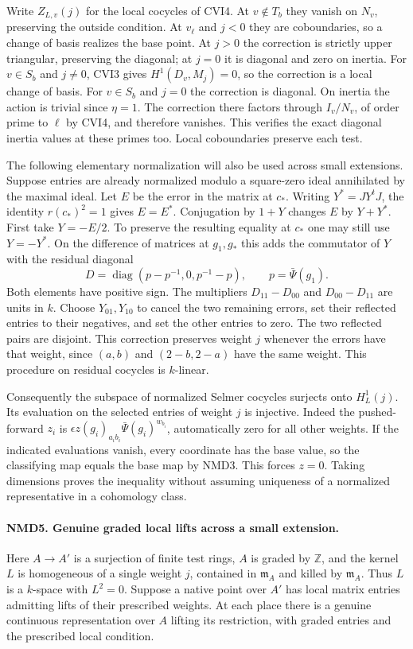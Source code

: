 Write $Z_{L,v}(j)$ for the local cocycles of CVI4. At
$v\notin T_b$ they vanish on $N_v$, preserving the outside
condition. At $v_\ell$ and $j<0$ they are coboundaries, so a
change of basis realizes the base point. At $j>0$ the correction is
strictly upper triangular, preserving the diagonal; at $j=0$ it is
diagonal and zero on inertia. For $v\in S_b$ and $j\ne0$, CVI3
gives $H^1(D_v,M_j)=0$, so the correction is a local change of
basis. For $v\in S_b$ and $j=0$ the correction is diagonal. On
inertia the action is trivial since $\eta=1$. The correction there
factors through $I_v/N_v$, of order prime to $\ell$ by CVI4, and
therefore vanishes. This verifies the exact diagonal inertia
values at these primes too. Local coboundaries preserve each test.

The following elementary normalization will also be used across
small extensions. Suppose entries are already normalized modulo a
square-zero ideal annihilated by the maximal ideal. Let $E$ be the
error in the matrix at $c_*$. Writing $Y^*=JY^tJ$, the identity
$r(c_*)^2=1$ gives $E=E^*$. Conjugation by $1+Y$ changes $E$ by
$Y+Y^*$. First take $Y=-E/2$. To preserve the resulting equality
at $c_*$ one may still use $Y=-Y^*$. On the difference of matrices
at $g_1,g_*$ this adds the commutator of $Y$ with the residual
diagonal
\[
  D=\operatorname{diag}(p-p^{-1},0,p^{-1}-p),
       \qquad p=\bar\Psi(g_1).
\]
Both elements have positive sign. The multipliers $D_{11}-D_{00}$
and $D_{00}-D_{11}$ are units in $k$. Choose $Y_{01},Y_{10}$
to cancel the two remaining errors, set their reflected entries to
their negatives, and set the other entries to zero. The two
reflected pairs are disjoint. This correction preserves weight
$j$ whenever the errors have that weight, since $(a,b)$ and
$(2-b,2-a)$ have the same weight. This procedure on residual
cocycles is $k$-linear.

Consequently the subspace of normalized Selmer cocycles surjects
onto $H^1_L(j)$. Its evaluation on the selected entries of weight
$j$ is injective. Indeed the pushed-forward $z_i$ is
$\epsilon z(g_i)_{a_i b_i}\bar\Psi(g_i)^{w_{b_i}}$, automatically
zero for all other weights. If the indicated evaluations vanish,
every coordinate has the base value, so the classifying map equals
the base map by NMD3. This forces $z=0$. Taking dimensions proves
the inequality without assuming uniqueness of a normalized
representative in a cohomology class.

\paragraph{NMD5. Genuine graded local lifts across a small extension.}
\label{claim:NMD5}
Here $A\to A'$ is a surjection of finite test rings, $A$ is graded
by $\mathbb Z$, and the kernel $L$ is homogeneous of a single weight
$j$, contained in $\mathfrak m_A$ and killed by $\mathfrak m_A$.
Thus $L$ is a $k$-space with $L^2=0$. Suppose a native point over
$A'$ has local matrix entries admitting lifts of their prescribed
weights. At each place there is a genuine continuous representation
over $A$ lifting its restriction, with graded entries and the
prescribed local condition.


